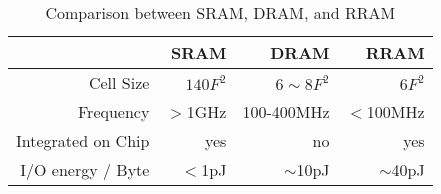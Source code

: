 \begin{table}[htbp]
    \centering
    \vspace{-5pt}
    \caption{Comparison between SRAM, DRAM, and RRAM}
    \vspace{-5pt}
      \begin{tabular}{|r|r|r|r|}
      \hline
            & SRAM  & DRAM  & RRAM \\
      \hline
      Cell Size & $140F^2$ & $6\sim8F^2$ & $6F^2$ \\
      \hline
      Frequency & $>$1GHz & 100-400MHz & $<$100MHz \\
      \hline
      Integrated on Chip & yes   & no    & yes \\
      \hline
      I/O energy / Byte & $<$1pJ   & $\sim$10pJ  & $\sim$40pJ \\
      \hline
      \end{tabular}
    \label{tab:ram}
    \vspace{-5pt}
\end{table}